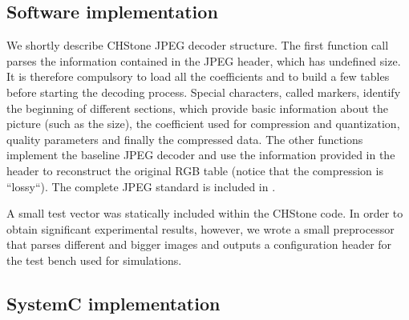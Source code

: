 \documentclass{acm_proc_article-sp}
\begin{document}
\subsection{Software implementation}

We shortly describe CHStone JPEG decoder structure. The first function call
parses the information contained in the JPEG header, which has undefined size.
It is therefore compulsory to load all the coefficients and to build a few tables
before starting the decoding process.
Special characters, called markers, identify the beginning of different sections,
which provide basic information about the picture (such as the size), the coefficient
used for compression and quantization, quality parameters and finally the
compressed data. The other functions implement the baseline JPEG decoder and
use the information provided in the header to reconstruct the original RGB
table (notice that the compression is ``lossy``). The complete JPEG standard is included
in \cite{jpeg}.

A small test vector was statically included within the CHStone code.
In order to obtain significant experimental results, however, we wrote a small
preprocessor that parses different and bigger images and outputs a configuration
header for the test bench used for simulations.

\subsection{SystemC implementation}
\end{document}
